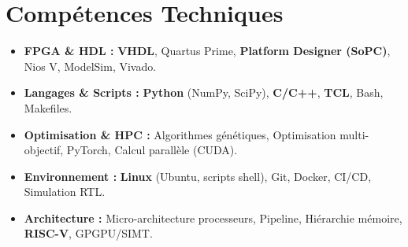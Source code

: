 \documentclass[a4paper,11pt]{article}
\begin{document}
\section{Compétences Techniques}
\begin{itemize}[leftmargin=*, nosep]
    \item \small{\textbf{FPGA \& HDL :} \textbf{VHDL}, Quartus Prime, \textbf{Platform Designer (SoPC)}, Nios V, ModelSim, Vivado.}
    \item \small{\textbf{Langages \& Scripts :} \textbf{Python} (NumPy, SciPy), \textbf{C/C++}, \textbf{TCL}, Bash, Makefiles.}
    \item \small{\textbf{Optimisation \& HPC :} Algorithmes génétiques, Optimisation multi-objectif, PyTorch, Calcul parallèle (CUDA).}
    \item \small{\textbf{Environnement :} \textbf{Linux} (Ubuntu, scripts shell), Git, Docker, CI/CD, Simulation RTL.}
    \item \small{\textbf{Architecture :} Micro-architecture processeurs, Pipeline, Hiérarchie mémoire, \textbf{RISC-V}, GPGPU/SIMT.}
\end{itemize}

\end{document}
